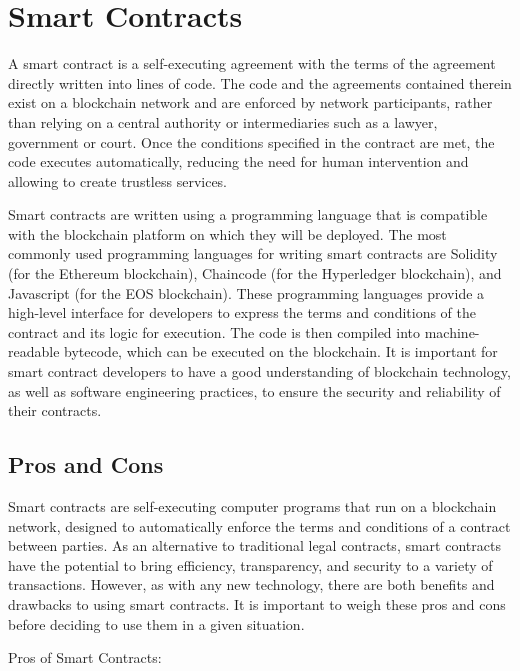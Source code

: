 \documentclass[target=mst,aauheader=]{thud}
\begin{document}
    \section{Smart Contracts}

    A smart contract is a self-executing agreement with the terms of the agreement directly written into lines of code. The code and the agreements contained therein exist on a blockchain network and are enforced by network participants, rather than relying on a central authority or intermediaries such as a lawyer, government or court. Once the conditions specified in the contract are met, the code executes automatically, reducing the need for human intervention and allowing to create trustless services.

    Smart contracts are written using a programming language that is compatible with the blockchain platform on which they will be deployed. The most commonly used programming languages for writing smart contracts are Solidity \cite{solidity} (for the Ethereum blockchain), Chaincode \cite{chaincode} (for the Hyperledger blockchain), and Javascript (for the EOS blockchain). These programming languages provide a high-level interface for developers to express the terms and conditions of the contract and its logic for execution. The code is then compiled into machine-readable bytecode, which can be executed on the blockchain. It is important for smart contract developers to have a good understanding of blockchain technology, as well as software engineering practices, to ensure the security and reliability of their contracts.

    \subsection{Pros and Cons}

    Smart contracts are self-executing computer programs that run on a blockchain network, designed to automatically enforce the terms and conditions of a contract between parties. As an alternative to traditional legal contracts, smart contracts have the potential to bring efficiency, transparency, and security to a variety of transactions. However, as with any new technology, there are both benefits and drawbacks to using smart contracts. It is important to weigh these pros and cons before deciding to use them in a given situation.\par
    
    Pros of Smart Contracts:
\end{document}
